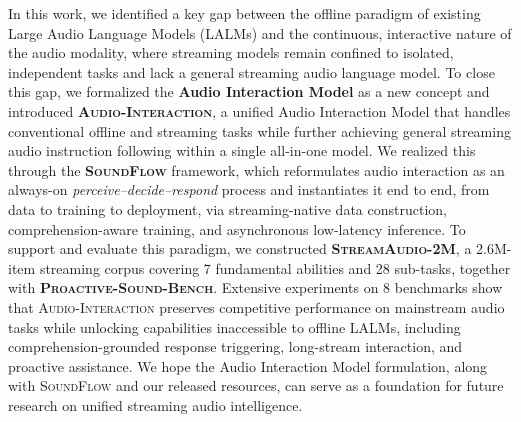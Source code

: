\documentclass{llmxive}
\begin{document}
In this work, we identified a key gap between the offline paradigm of existing Large Audio Language Models (LALMs) and the continuous, interactive nature of the audio modality, where streaming models remain confined to isolated, independent tasks and lack a general streaming audio language model. To close this gap, we formalized the \textbf{Audio Interaction Model} as a new concept and introduced \textbf{\textsc{Audio-Interaction}}, a unified Audio Interaction Model that handles conventional offline and streaming tasks while further achieving general streaming audio instruction following within a single all-in-one model. We realized this through the \textbf{\textsc{SoundFlow}} framework, which reformulates audio interaction as an always-on \textit{perceive--decide--respond} process and instantiates it end to end, from data to training to deployment, via streaming-native data construction, comprehension-aware training, and asynchronous low-latency inference. To support and evaluate this paradigm, we constructed \textbf{\textsc{StreamAudio-2M}}, a 2.6M-item streaming corpus covering 7 fundamental abilities and 28 sub-tasks, together with \textbf{\textsc{Proactive-Sound-Bench}}. Extensive experiments on 8 benchmarks show that \textsc{Audio-Interaction} preserves competitive performance on mainstream audio tasks while unlocking capabilities inaccessible to offline LALMs, including comprehension-grounded response triggering, long-stream interaction, and proactive assistance. We hope the Audio Interaction Model formulation, along with \textsc{SoundFlow} and our released resources, can serve as a foundation for future research on unified streaming audio intelligence.
\end{document}
